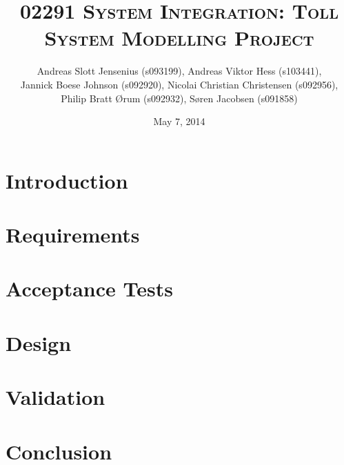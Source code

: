 \documentclass[11pt]{report}
\begin{document}
\title{\textsc{02291 System Integration: Toll System Modelling Project}}
\date{May 7, 2014}
\author{Andreas Slott Jensenius (s093199), Andreas Viktor Hess (s103441),\\
        Jannick Boese Johnson (s092920), Nicolai Christian Christensen (s092956),\\
        Philip Bratt Ørum (s092932), Søren Jacobsen (s091858)}
        

\maketitle

\fancyhead{}
\fancyfoot{}
\fancyfoot[C]{\thepage}

\pagestyle{fancy}

\tableofcontents

\chapter{Introduction}



\chapter{Requirements}


\chapter{Acceptance Tests}


\chapter{Design}


\chapter{Validation}


\chapter{Conclusion}

\end{document}
